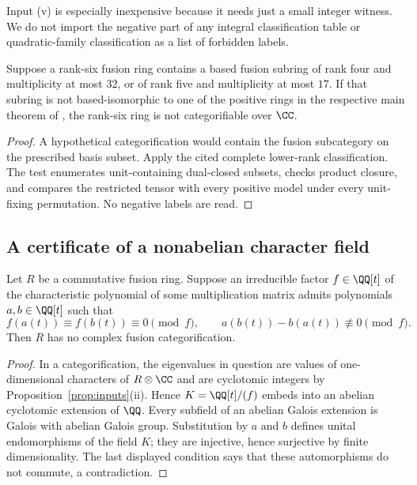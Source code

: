 Input (v) is especially inexpensive because it needs just a small
integer witness. We do not import the negative part of any integral
classification table or quadratic-family classification as a list of
forbidden labels.

\begin{corollary}\label{cor:subring}
Suppose a rank-six fusion ring contains a based fusion subring of rank
four and multiplicity at most $32$, or of rank five and multiplicity at
most $17$. If that subring is not based-isomorphic to one of the positive
rings in the respective main theorem of \cite{DP4,DP5}, the rank-six
ring is not categorifiable over $\CC$.
\end{corollary}
\begin{proof}
A hypothetical categorification would contain the fusion subcategory
on the prescribed basis subset. Apply the cited complete lower-rank
classification. The test enumerates unit-containing dual-closed subsets,
checks product closure, and compares the restricted tensor with every
positive model under every unit-fixing permutation. No negative labels
are read.
\end{proof}


\subsection{A certificate of a nonabelian character field}
\begin{theorem}\label{thm:automorphisms}
Let $R$ be a commutative fusion ring. Suppose an irreducible factor
$f\in\QQ[t]$ of the characteristic polynomial of some multiplication
matrix admits polynomials $a,b\in\QQ[t]$ such that
\[
 f(a(t))\equiv f(b(t))\equiv0\pmod f,
 \qquad a(b(t))-b(a(t))\not\equiv0\pmod f.
\]
Then $R$ has no complex fusion categorification.
\end{theorem}
\begin{proof}
In a categorification, the eigenvalues in question are values of
one-dimensional characters of $R\otimes\CC$ and are cyclotomic integers
by Proposition~\ref{prop:inputs}(ii). Hence $K=\QQ[t]/(f)$ embeds into an
abelian cyclotomic extension of $\QQ$. Every subfield of an abelian
Galois extension is Galois with abelian Galois group. Substitution by
$a$ and $b$ defines unital endomorphisms of the field $K$; they are
injective, hence surjective by finite dimensionality. The last displayed
condition says that these automorphisms do not commute, a contradiction.
\end{proof}

